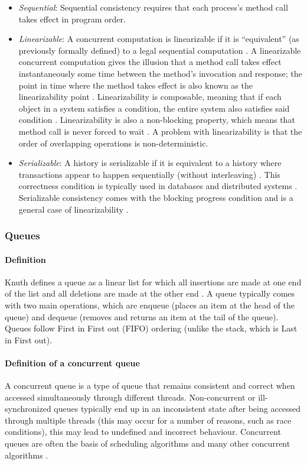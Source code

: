 \documentclass[a4paper, 12pt, titlepage]{article}
\begin{document}
\begin{onehalfspacing}
\begin{itemize}
\item \emph{Sequential}: Sequential consistency requires that each process's method call takes effect in program order.
\item \emph{Linearizable}: A concurrent computation is linearizable if it is ``equivalent'' (as previously formally defined) to a legal sequential computation \cite{herlihy1990linearizability}. A linearizable concurrent computation gives the illusion that a method call takes effect instantaneously some time between the method's invocation and response; the point in time where the method takes effect is also known as the linearizability point \cite{herlihy2020art,herlihy1990linearizability}. Linearizability is composable, meaning that if each object in a system satisfies a condition, the entire system also satisfies said condition \cite[Chapter~3.3.1]{herlihy2020art}. Linearizability is also a non-blocking property, which means that method call is never forced to wait \cite{herlihy1990linearizability}. A problem with linearizability is that the order of overlapping operations is non-deterministic.
\item \emph{Serializable}: A history is serializable if it is equivalent to a history where transactions appear to happen sequentially (without interleaving) \cite[Section~3.3]{herlihy1990linearizability}. This correctness condition is typically used in databases and distributed systems \cite{guerraoui2019consensus}. Serializable consistency comes with the blocking progress condition and is a general case of linearizability \cite{herlihy1990linearizability}.
\end{itemize}
\subsubsection{Queues}
\paragraph{Definition}
Knuth defines a queue as a linear list for which all insertions are made at one end of the list and all deletions are made at the other end \cite{knuth1968art}. A queue typically comes with two main operations, which are enqueue (places an item at the head of the queue) and dequeue (removes and returns an item at the tail of the queue). Queues follow First in First out (FIFO) ordering (unlike the stack, which is Last in First out).
\paragraph{Definition of a concurrent queue}
A concurrent queue is a type of queue that remains consistent and correct when accessed simultaneously through different threads. Non-concurrent or ill-synchronized queues typically end up in an inconsistent state after being accessed through multiple threads (this may occur for a number of reasons, such as race conditions)\cite{yahav2003automatically}, this may lead to undefined and incorrect behaviour. Concurrent queues are often the basis of scheduling algorithms and many other concurrent algorithms \cite{yahav2003automatically}.

\end{onehalfspacing}
\end{document}

